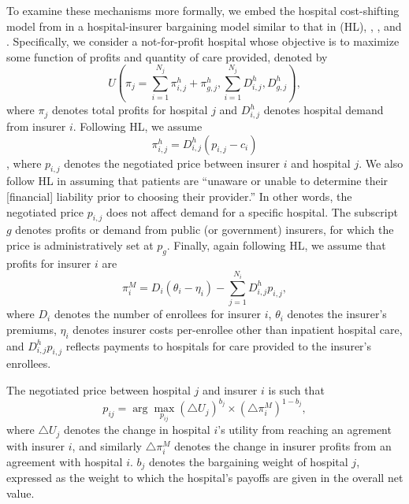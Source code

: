 \documentclass[12pt]{article}
\begin{document}
To examine these mechanisms more formally, we embed the hospital cost-shifting model from \cite{dranove1988} in a hospital-insurer bargaining model similar to that in \cite{ho2016} (HL), \cite{gowrisankaran2015}, \cite{lewis2015}, and \cite{dor2004}. Specifically, we consider a not-for-profit hospital whose objective is to maximize some function of profits and quantity of care provided, denoted by
\begin{equation}
 U\left( \pi_{j} = \sum_{i=1}^{N_{j}} \pi_{i,j}^{h} + \pi_{g,j}^{h}, \sum_{i=1}^{N_{j}} D_{i,j}^{h}, D_{g,j}^{h} \right),
\label{eqn:nfp_objective}
\end{equation}
where $\pi_{j}$ denotes total profits for hospital $j$ and $D_{i,j}^{h}$ denotes hospital demand from insurer $i$. Following HL, we assume $$\pi_{i,j}^{h}=D_{i,j}^{h}(p_{i,j}-c_{i})$$, where $p_{i,j}$ denotes the negotiated price between insurer $i$ and hospital $j$. We also follow HL in assuming that patients are ``unaware or unable to determine their [financial] liability prior to choosing their provider.'' In other words, the negotiated price $p_{i,j}$ does not affect demand for a specific hospital. The subscript $g$ denotes profits or demand from public (or government) insurers, for which the price is administratively set at $p_{g}$. Finally, again following HL, we assume that profits for insurer $i$ are
\begin{equation}
\pi_{i}^{M} = D_{i} \left( \theta_{i} - \eta_{i} \right) - \sum_{j=1}^{N_{i}} D_{i,j}^{h} p_{i,j},
\label{eqn:ins_profit}
\end{equation}
where $D_{i}$ denotes the number of enrollees for insurer $i$, $\theta_{i}$ denotes the insurer's premiums, $\eta_{i}$ denotes insurer costs per-enrollee other than inpatient hospital care, and $D_{i,j}^{h} p_{i,j}$ reflects payments to hospitals for care provided to the insurer's enrollees.

The negotiated price between hospital $j$ and insurer $i$ is such that
\begin{equation}
 p_{ij}= \arg \max_{p_{ij}} \left(\triangle U_{j} \right)^{b_{j}} \times \left(\triangle \pi^{M}_{i} \right)^{1-b_{j}},
 \label{eqn:neg_price}
\end{equation}
where $\triangle U_{j}$ denotes the change in hospital $i$'s utility from reaching an agrement with insurer $i$, and similarly $\triangle \pi^{M}_{i}$ denotes the change in insurer profits from an agreement with hospital $i$. $b_{j}$ denotes the bargaining weight of hospital $j$, expressed as the weight to which the hospital's payoffs are given in the overall net value.
\end{document}
